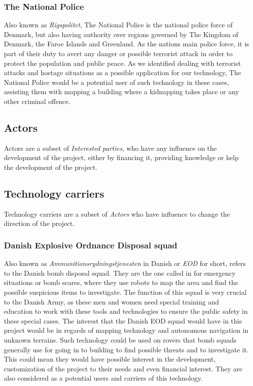 \subsubsection{The National Police}
Also known as \textit{Rigspolitet}\cite{Police}, The National Police is the national police force of Denmark, but also having authority over regions governed by The Kingdom of Denmark, the Faroe Islands and Greenland. As the nations main police force, it is part of their duty to avert any danger or possible terrorist attack in order to protect the population and public peace. As we identified dealing with terrorist attacks and hostage situations as a possible application for our technology, The National Police would be a potential user of such technology in these cases, assisting them with mapping a building where a kidnapping takes place or any other criminal offence.

\subsection{Actors}
Actors are a subset of \textit{Interested parties}, who have any influence on the development of the project, either by financing it, providing knowledge or help the development of the project.
	
\subsection{Technology carriers}
Technology carriers are a subset of \textit{Actors} who have influence to change the direction of the project.

\subsubsection{Danish Explosive Ordnance Disposal squad} 
Also known as \textit{Ammunitionsrydningstjenesten} in Danish or \textit{EOD} for short, refers to the Danish bomb disposal squad\cite{EOD}. They are the one called in for emergency situations or bomb scares, where they use robots to map the area and find the possible suspicious items to investigate. The function of this squad is very crucial to the Danish Army, as these men and women need special training and education to work with these tools and technologies to ensure the public safety in these special cases. The interest that the Danish EOD squad would have in this project would be in regards of mapping technology and autonomous navigation in unknown terrains. Such technology could be used on rovers that bomb squads generally use for going in to building to find possible threats and to investigate it. This could mean they would have possible interest in the development, customization of the project to their needs and even financial interest. They are also considered as a potential users and carriers of this technology.

